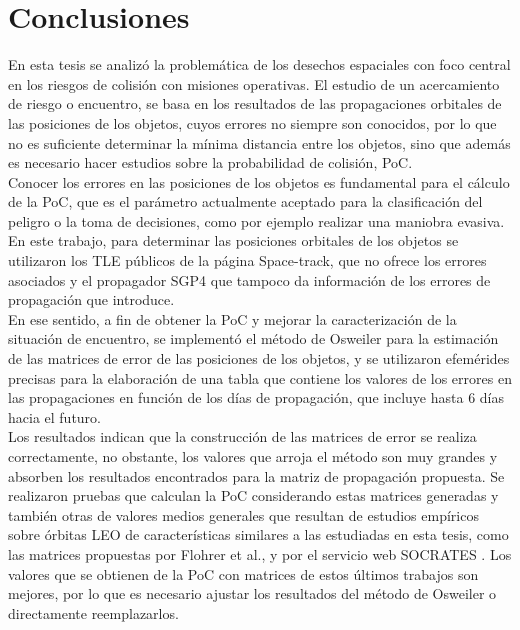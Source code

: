  \chapter{Conclusiones}
\label{chap:conclusiones}

En esta tesis se analiz\'o la problem\'atica de los desechos espaciales con foco central en los riesgos de colisi\'on con misiones operativas. El estudio de un acercamiento de riesgo o encuentro, se basa en los resultados de las propagaciones orbitales de las posiciones de los objetos, cuyos errores no siempre son conocidos, por lo que no es suficiente determinar la m\'inima distancia entre los objetos, sino que adem\'as es necesario hacer estudios sobre la probabilidad de colisi\'on, PoC.\\

Conocer los errores en las posiciones de los objetos es fundamental para el c\'alculo de la PoC, que es el par\'ametro actualmente aceptado para la clasificaci\'on del peligro o la toma de decisiones, como por ejemplo realizar una maniobra evasiva.\\ 

En este trabajo, para determinar las posiciones orbitales de los objetos se utilizaron los TLE p\'ublicos de la p\'agina Space-track, que no ofrece los errores asociados y el propagador SGP4 \citep{sgp4python} que tampoco da informaci\'on de los errores de propagaci\'on que introduce.\\

En ese sentido, a fin de obtener la PoC y mejorar la caracterizaci\'on de la situaci\'on de encuentro, se implement\'o el m\'etodo de Osweiler \citep{osweiler} para la estimaci\'on de las matrices de error de las posiciones de los objetos, y se utilizaron efem\'erides precisas para la elaboraci\'on de una tabla que contiene los valores de los errores en las propagaciones en funci\'on de los d\'ias de propagaci\'on, que incluye hasta 6 d\'ias hacia el futuro.\\

Los resultados indican que la construcci\'on de las matrices de error se realiza correctamente, no obstante, los valores que arroja el m\'etodo son muy grandes y absorben los resultados encontrados para la matriz de propagaci\'on propuesta. Se realizaron pruebas que calculan la PoC considerando estas matrices generadas y tambi\'en otras de valores medios generales que resultan de estudios emp\'iricos sobre \'orbitas LEO de caracter\'isticas similares a las estudiadas en esta tesis, como las matrices propuestas por Flohrer et al., \citep{flohrer2008assessment} y por el servicio web SOCRATES \citep{Kelso}. Los valores que se obtienen de la PoC con matrices de estos \'ultimos trabajos son mejores, por lo que es necesario ajustar los resultados del m\'etodo de Osweiler o directamente reemplazarlos.\\


